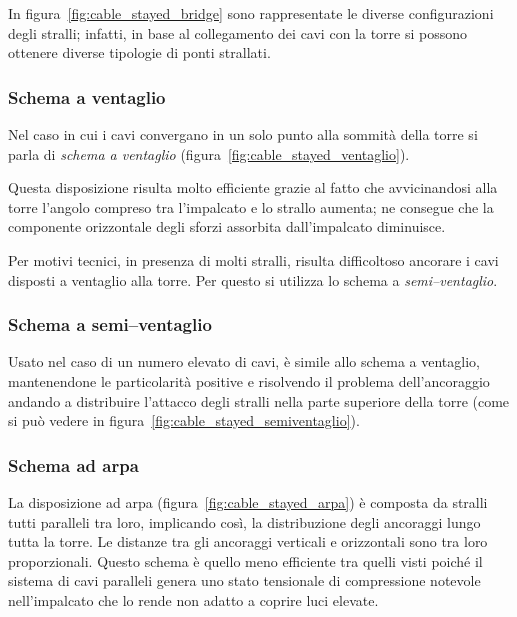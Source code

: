 In figura~\ref{fig:cable_stayed_bridge} sono rappresentate le diverse configurazioni degli stralli; infatti, in base al collegamento dei cavi con la torre si possono ottenere diverse tipologie di ponti strallati.
\subsubsection{Schema a ventaglio}

Nel caso in cui i cavi convergano in un solo punto alla sommità della torre si parla di \emph{schema a ventaglio} (figura~\ref{fig:cable_stayed_ventaglio}).

Questa disposizione risulta molto efficiente grazie al fatto che avvicinandosi alla torre l'angolo compreso tra l'impalcato e lo strallo aumenta; ne consegue che la componente orizzontale degli sforzi assorbita dall'impalcato diminuisce. 

Per motivi tecnici, in presenza di molti stralli, risulta difficoltoso ancorare i cavi disposti a ventaglio alla torre. Per questo si utilizza lo schema a \emph{semi--ventaglio}.

\subsubsection{Schema a semi--ventaglio}
Usato nel caso di un numero elevato di cavi, è simile allo schema a ventaglio, mantenendone le particolarità positive e risolvendo il problema dell'ancoraggio andando a distribuire l'attacco degli stralli nella parte superiore della torre (come si può vedere in figura~\ref{fig:cable_stayed_semiventaglio}).

\subsubsection{Schema ad arpa}
La disposizione ad arpa (figura~\ref{fig:cable_stayed_arpa}) è composta da stralli tutti paralleli tra loro, implicando così, la distribuzione degli ancoraggi lungo tutta la torre.
Le distanze tra gli ancoraggi verticali e orizzontali sono tra loro proporzionali.
Questo schema è quello meno efficiente tra quelli visti poiché il sistema di cavi paralleli genera uno stato tensionale di compressione notevole nell'impalcato che lo rende non adatto a coprire luci elevate.







 


